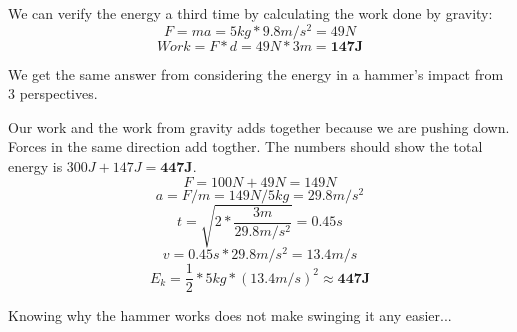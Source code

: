 \documentclass[11pt,a4paper]{article}
\begin{document}
We can verify the energy a third time by calculating the work done by gravity:
$$F=ma=5kg*9.8m/s^2 = 49N$$
$$Work = F*d = 49N*3m = \mathbf{147J}$$

We get the same answer from considering the energy in a hammer's impact from 3 perspectives.

Our work and the work from gravity adds together because we are pushing down. Forces in the same direction add togther.
The numbers should show the total energy is $300J + 147J = \mathbf{447J}$.
$$F =  100N + 49N = 149N$$
$$a = F/m = 149N/5kg = 29.8m/s^2$$
$$t=\sqrt{2*\frac{3m}{29.8m/s^2}}= 0.45s$$
$$v = 0.45s * 29.8m/s^2= 13.4m/s$$
$$E_k=\frac{1}{2}*5kg*(13.4m/s)^2\approx\mathbf{447J}$$

Knowing why the hammer works does not make swinging it any easier...
\end{document}
